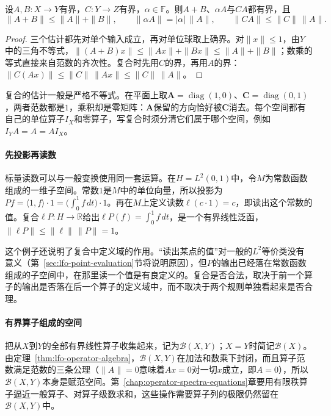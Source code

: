 \begin{theorem}[算子运算的范数估计]
\label{thm:lfo-operator-algebra}
设$A,B:X\to Y$有界，$C:Y\to Z$有界，$\alpha\in\mathbb F$。则$A+B$、$\alpha A$与$CA$都有界，且
\[
 \|A+B\|\leq\|A\|+\|B\|,\qquad \|\alpha A\|=|\alpha|\,\|A\|,\qquad \|CA\|\leq\|C\|\,\|A\| .
\]
\end{theorem}

\begin{proof}
三个估计都先对单个输入成立，再对单位球取上确界。对$\|x\|\leq1$，由$Y$中的三角不等式，$\|(A+B)x\|\leq\|Ax\|+\|Bx\|\leq\|A\|+\|B\|$；数乘的等式直接来自范数的齐次性。复合时先用$C$的界，再用$A$的界：$\|C(Ax)\|\leq\|C\|\,\|Ax\|\leq\|C\|\,\|A\|$。
\end{proof}

复合的估计一般是严格不等式。在平面上取$\bm A=\operatorname{diag}(1,0)$、$\bm C=\operatorname{diag}(0,1)$，两者范数都是$1$，乘积却是零矩阵：$\bm A$保留的方向恰好被$\bm C$消去。每个空间都有自己的单位算子$I_X$和零算子，写复合时须分清它们属于哪个空间，例如$I_YA=A=AI_X$。

\paragraph{先投影再读数}
标量读数可以与一般变换使用同一套运算。在$H=L^2(0,1)$中，令$M$为常数函数组成的一维子空间。常数$1$是$M$中的单位向量，所以投影为$Pf=\langle1,f\rangle\cdot1=\bigl(\int_0^1f\,dt\bigr)\cdot1$。再在$M$上定义读数$\ell(c\cdot1)=c$，即读出这个常数的值。复合$\ell P:H\to\mathbb R$给出$\ell P(f)=\int_0^1f\,dt$，是一个有界线性泛函，$\|\ell P\|\leq\|\ell\|\,\|P\|=1$。

这个例子还说明了复合中定义域的作用。“读出某点的值”对一般的$L^2$等价类没有意义（第~\ref{sec:lfo-point-evaluation}节将说明原因），但$P$的输出已经落在常数函数组成的子空间中，在那里读一个值是有良定义的。复合是否合法，取决于前一个算子的输出是否落在后一个算子的定义域中，而不取决于两个规则单独看起来是否合理。

\paragraph{有界算子组成的空间}
把从$X$到$Y$的全部有界线性算子收集起来，记为$\mathcal B(X,Y)$；$X=Y$时简记$\mathcal B(X)$。由定理~\ref{thm:lfo-operator-algebra}，$\mathcal B(X,Y)$在加法和数乘下封闭，而且算子范数满足范数的三条公理（$\|A\|=0$意味着$Ax=0$对一切$x$成立，即$A=0$），所以$\mathcal B(X,Y)$本身是赋范空间。第~\ref{chap:operator-spectra-equations}章要用有限秩算子逼近一般算子、对算子级数求和，这些操作需要算子列的极限仍然留在$\mathcal B(X,Y)$中。

